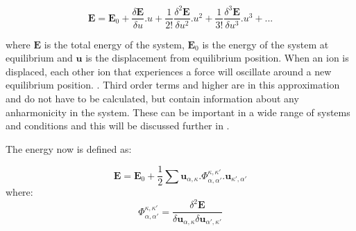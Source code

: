 \begin{equation}
\boldsymbol{E} = \boldsymbol{E}_0 + \frac{\delta \boldsymbol{E}}{\delta u}.u + \frac{1}{2!} \frac{\delta^2 \boldsymbol{E}}{\delta u^2}.u^2 + \frac{1}{3!} \frac{\delta^3 \boldsymbol{E}}{\delta u^3}.u^3 + ...
\label{eqn:ETaylor}
\end{equation}

where \(\boldsymbol{E}\) is the total energy of the system, \(\boldsymbol{E}_0\) is the energy of the system at equilibrium  and \(\boldsymbol{u}\) is the displacement from equilibrium position. When an ion is displaced, each other ion that experiences a force will oscillate around a new equilibrium position. \DIFdelbegin {}%
\DIFdelend \DIFaddbegin {}\DIFaddend {} \DIFdelbegin {}\DIFdelend \DIFaddbegin {}\DIFaddend . Third order terms and higher are \DIFdelbegin {}\DIFdelend \DIFaddbegin {}\DIFaddend in this approximation and \DIFaddbegin {}\DIFaddend do not have to be calculated, but contain information about any anharmonicity in the system. These can be important in a wide range of systems and conditions and this will be discussed further in . \DIFdelbegin %

\DIFdelend The energy now is defined as:

\begin{equation}
\boldsymbol{E} = \boldsymbol{E}_0 + \frac{1}{2} \sum \boldsymbol{u}_{\alpha, \kappa}.\Phi_{\alpha, \alpha'}^{\kappa, \kappa'}.\boldsymbol{u}_{\kappa', \alpha'}
\end{equation}
where:
\begin{equation}
\Phi_{\alpha, \alpha'}^{\kappa, \kappa'} =  \frac{\delta^2 \boldsymbol{E}}{\delta \boldsymbol{u}_{\alpha, \kappa} \delta \boldsymbol{u}_{\alpha', \kappa'}}
\end{equation}

